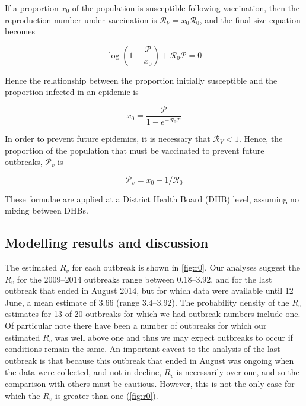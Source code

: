 \documentclass{article}
\newcommand{\Pe}{\mathcal{P}}
\newcommand{\Ro}{\mathcal{R}_0}
\newcommand{\Pv}{\mathcal{P}_v}
\newcommand{\Rr}{\mathcal{R}}
\begin{document}
If a proportion $x_0$ of the population is susceptible following vaccination, then the  reproduction number under vaccination is $\Rr_V=x_0\Ro$, and the final size equation becomes

\begin{equation} \label{eq:eqn2}
\log\left(1-\frac{\Pe}{x_0}\right)+\Ro\Pe=0
\end{equation}

Hence the relationship between the proportion initially susceptible and the proportion infected in an epidemic is

\begin{equation} \label{eq:eqn3}
x_0=\frac{\Pe}{1-e^{-\Ro\Pe}}
\end{equation}

In order to prevent future epidemics, it is necessary that $\Rr_V<1$. Hence, the proportion of the population that must be vaccinated to prevent future outbreaks, $\Pv$ is

\begin{equation} \label{eq:prop}
\Pv = x_0-1/\Ro
\end{equation}

These formulae are applied at a District Health Board (DHB) level, assuming no mixing between DHBs.

\subsection{Modelling results and discussion}

The estimated $R_v$ for each outbreak is shown in \autoref{fig:r0}. Our analyses suggest the $R_v$ for the 2009--2014 outbreaks range between 0.18--3.92, and for the last outbreak that ended in August 2014, but for which data were available until 12 June, a mean estimate of 3.66 (range 3.4--3.92). The probability density of the $R_v$ estimates for 13 of 20 outbreaks for which we had outbreak numbers include one. Of particular note there have been a number of outbreaks for which our estimated $R_v$ was well above one and thus we may expect outbreaks to occur if conditions remain the same. An important caveat to the analysis of the last outbreak is that because this outbreak that ended in August was ongoing when the data were collected, and not in decline, $R_v$ is necessarily over one, and so the comparison with others must be cautious. However, this is not the only case for which the $R_v$ is greater than one (\autoref{fig:r0}).
\end{document}
